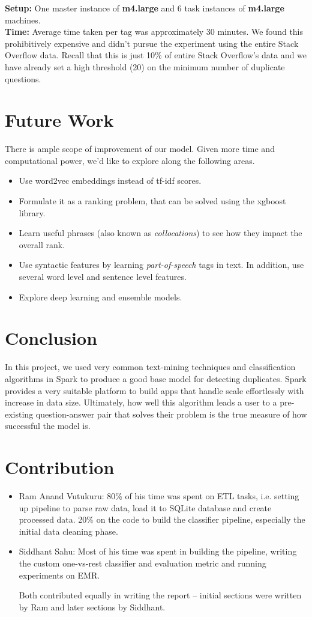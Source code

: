 \documentclass{article}
\begin{document}
\textbf{Setup:} One master instance of \textbf{m4.large} and 6 task instances of \textbf{m4.large} machines.\\

\textbf{Time:} Average time taken per tag was approximately 30 minutes. We found this prohibitively expensive and didn't pursue the experiment using the entire Stack Overflow data. Recall that this is just 10\% of entire Stack Overflow's data and we have already set a high threshold (20) on the minimum number of duplicate questions.

\section{Future Work}
There is ample scope of improvement of our model. Given more time and computational power, we'd like to explore along the following areas.

\begin{itemize}
	\item Use word2vec embeddings instead of tf-idf scores.
	\item Formulate it as a ranking problem, that can be solved using the xgboost library.
	\item Learn useful phrases (also known as \textit{collocations}) to see how they impact the overall rank.
	\item Use syntactic features by learning \textit{part-of-speech} tags in text. In addition, use several word level and sentence level features.
	\item Explore deep learning and ensemble models.
\end{itemize}

\section{Conclusion}
In this project, we used very common text-mining techniques and classification algorithms in Spark to produce a good base model for detecting duplicates. Spark provides a very suitable platform to build apps that handle scale effortlessly with increase in data size. Ultimately, how well this algorithm leads a user to a pre-existing question-answer pair that solves their problem is the true measure of how successful the model is.

\section{Contribution}
\begin{itemize}
	\item Ram Anand Vutukuru: 80\% of his time was spent on ETL tasks, i.e. setting up pipeline to parse raw data, load it to SQLite database and create processed data. 20\% on the code to build the classifier pipeline, especially the initial data cleaning phase.
	\item Siddhant Sahu: Most of his time was spent in building the pipeline, writing the custom one-vs-rest classifier and evaluation metric and running experiments on EMR.
	
	Both contributed equally in writing the report -- initial sections were written by Ram and later sections by Siddhant.
\end{itemize}
\end{document}
